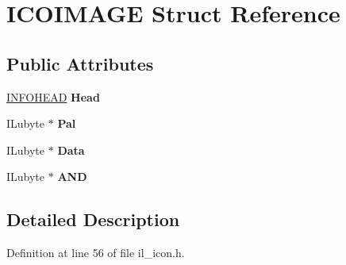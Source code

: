 \hypertarget{structICOIMAGE}{}\section{I\+C\+O\+I\+M\+A\+GE Struct Reference}
\label{structICOIMAGE}
\subsection*{Public Attributes}
\begin{DoxyCompactItemize}
\item 
\mbox{\label{structICOIMAGE_a50b0b3c3e61da6b77c3bad60c73e6002}} 
\hyperlink{structINFOHEAD}{I\+N\+F\+O\+H\+E\+AD} {\bfseries Head}
\item 
\mbox{\label{structICOIMAGE_a8f4c1790c54d72e422d6da15a402cd54}} 
I\+Lubyte $\ast$ {\bfseries Pal}
\item 
\mbox{\label{structICOIMAGE_acde0f8d93798a34454eb9ba22b5aa6bb}} 
I\+Lubyte $\ast$ {\bfseries Data}
\item 
\mbox{\label{structICOIMAGE_a707a2c74ec19c10a5c13b880410d4722}} 
I\+Lubyte $\ast$ {\bfseries A\+ND}
\end{DoxyCompactItemize}


\subsection{Detailed Description}


Definition at line 56 of file il\+\_\+icon.\+h.



